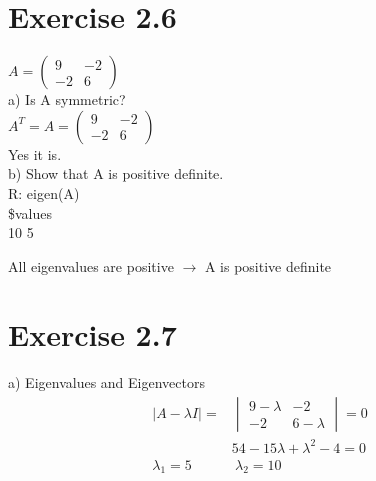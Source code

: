 \documentclass[a4paper,10pt]{article}
\title{}
\author{}
\date{}
\begin{document}
\maketitle

\section{Exercise 2.6}
$A= \begin{pmatrix}
9 & -2 \\
-2 & 6 \end{pmatrix}$\\


a) Is A symmetric?\\
$A^T = A= \begin{pmatrix}
9 & -2 \\
-2 & 6 \end{pmatrix}$\\
Yes it is.\\

b) Show that A is positive definite.\\
R: eigen(A)\\
\$values\\
10  5

All eigenvalues are positive $\rightarrow$ A is positive definite\\

\section{Exercise 2.7}
a) Eigenvalues and Eigenvectors\\
\begin{align*}
  \mid A - \lambda I\mid =& \begin{vmatrix} 9-\lambda & -2 \\ -2 & 6-\lambda \end{vmatrix} = 0\\
  & 54 - 15 \lambda + \lambda^2 - 4 = 0\\
  \lambda_1 = 5\ &\ \lambda_2 = 10
 \end{align*}
 
\end{document}
